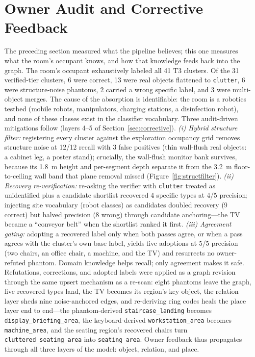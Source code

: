 \section{Owner Audit and Corrective Feedback}
\label{sec:exp-owner}

The preceding section measured what the pipeline believes; this one measures
what the room's occupant knows, and how that knowledge feeds back into the
graph. The room's occupant exhaustively labeled all 41 T3 clusters. Of the 31
verified-tier clusters, 6 were correct, 13 were real objects flattened to
\texttt{clutter}, 6 were structure-noise phantoms, 2 carried a wrong specific
label, and 3 were multi-object merges. The cause of the absorption is
identifiable: the room is a robotics testbed (mobile robots, manipulators,
charging stations, a disinfection robot), and none of these classes exist in
the classifier vocabulary. Three audit-driven mitigations follow (layers 4--5 of
Section~\ref{sec:corrective}). \emph{(i) Hybrid structure filter:} registering
every cluster against the exploration occupancy grid removes structure noise at
12/12 recall with 3 false positives (thin wall-flush real objects: a cabinet
leg, a poster stand); crucially, the wall-flush monitor bank survives, because
its 1.8~m height and per-segment depth separate it from the 3.2~m
floor-to-ceiling wall band that plane removal missed
(Figure~\ref{fig:structfilter}). \emph{(ii) Recovery re-verification:}
re-asking the verifier with \texttt{clutter} treated as unidentified plus a
candidate shortlist recovered 4 specific types at 4/5 precision; injecting
site vocabulary (robot classes) as candidates doubled recovery (9 correct) but
halved precision (8 wrong) through candidate anchoring---the TV became a
``conveyor belt'' when the shortlist ranked it first. \emph{(iii) Agreement
gating:} adopting a recovered label only when both passes agree, or when a
pass agrees with the cluster's own base label, yields five adoptions at 5/5
precision (two chairs, an office chair, a machine, and the TV) and resurrects
no owner-refuted phantom. Domain knowledge helps recall; only agreement makes
it safe. Refutations, corrections, and adopted labels were applied as a graph
revision through the same upsert mechanism as a re-scan: eight phantoms leave
the graph, five recovered types land, the TV becomes its region's key object,
the relation layer sheds nine noise-anchored edges, and re-deriving ring codes
heals the place layer end to end---the phantom-derived
\texttt{staircase\_landing} becomes \texttt{display\_briefing\_area}, the
keyboard-derived \texttt{workstation\_area} becomes \texttt{machine\_area},
and the seating region's recovered chairs turn
\texttt{cluttered\_seating\_area} into \texttt{seating\_area}. Owner feedback
thus propagates through all three layers of the model: object, relation, and
place.

